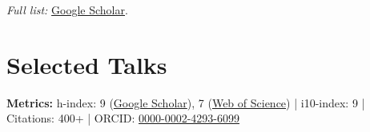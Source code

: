 \documentclass[10pt,a4paper,colorlinks,linkcolor=blue,urlcolor=blue,citecolor=blue]{moderncv}
\begin{document}
\textit{Full list:} \href{https://scholar.google.com/citations?user=67aQviYAAAAJ&hl=en}{Google Scholar}.

\section{Selected Talks}

\vspace{0.2cm}
\textbf{Metrics:} h-index: 9 (\href{https://scholar.google.com/citations?user=67aQviYAAAAJ&hl=en}{Google Scholar}), 7 (\href{https://www.webofscience.com/wos/author/record/1935508}{Web of Science}) | i10-index: 9 | Citations: 400+ | ORCID: \href{https://orcid.org/0000-0002-4293-6099}{0000-0002-4293-6099}
\end{document}
